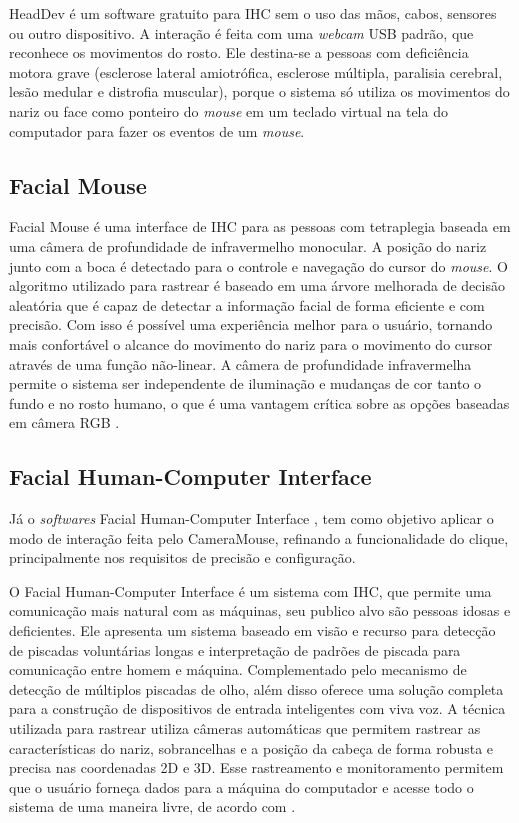 HeadDev é um software gratuito para IHC sem o uso das mãos, cabos, sensores ou outro dispositivo. A interação é feita com uma \textit{webcam} USB padrão, que reconhece os movimentos do rosto. Ele destina-se a pessoas com deficiência motora grave (esclerose lateral amiotrófica, esclerose múltipla, paralisia cerebral, lesão medular e distrofia muscular), porque o sistema só utiliza os movimentos do nariz ou face como ponteiro do \textit{mouse} em um teclado virtual na tela do computador para fazer os eventos de um \textit{mouse}.

\subsection{Facial Mouse}

Facial Mouse é uma interface de IHC para as pessoas com tetraplegia baseada em uma câmera de profundidade de infravermelho monocular. A posição do nariz junto com a boca é detectado para o controle e navegação do cursor do \textit{mouse}. O algoritmo utilizado para rastrear é baseado em uma árvore melhorada de decisão aleatória que é capaz de detectar a informação facial de forma eficiente e com precisão. Com isso é possível uma experiência melhor para o usuário, tornando mais confortável o alcance do movimento do nariz para o movimento do cursor através de uma função não-linear. A câmera de profundidade infravermelha permite o sistema ser independente de iluminação e mudanças de cor tanto o fundo e no rosto humano, o que é uma vantagem crítica sobre as opções baseadas em câmera RGB .

\subsection{Facial Human-Computer Interface}

Já o \textit{softwares} Facial Human-Computer Interface , tem como objetivo aplicar o modo de interação feita pelo CameraMouse, refinando a funcionalidade do clique, principalmente nos requisitos de precisão e configuração.

O Facial Human-Computer Interface é um sistema com IHC, que permite uma comunicação mais natural com as máquinas, seu publico alvo são pessoas idosas e deficientes. Ele apresenta um sistema baseado em visão e recurso para detecção de piscadas voluntárias longas e interpretação de padrões de piscada para comunicação entre homem e máquina. Complementado pelo mecanismo de detecção de múltiplos piscadas de olho, além disso oferece uma solução completa para a construção de dispositivos de entrada inteligentes com viva voz. A técnica utilizada para rastrear utiliza câmeras automáticas que permitem rastrear as características do nariz, sobrancelhas e a posição da cabeça de forma robusta e precisa nas coordenadas 2D e 3D. Esse rastreamento e monitoramento permitem que o usuário forneça dados para a máquina do computador e acesse todo o sistema de uma maneira livre, de acordo com . 


